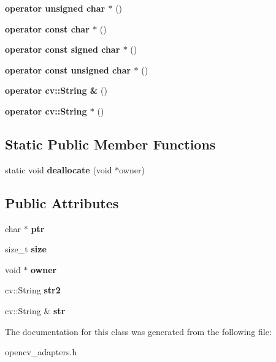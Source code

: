 \begin{DoxyCompactItemize}
{\bfseries operator unsigned char $\ast$} ()
\item 
\mbox{\label{class_str_adapter_acf859f32607b3ea2f85ea35dba26ead6}} 
{\bfseries operator const char $\ast$} ()
\item 
\mbox{\label{class_str_adapter_a37e14f172fc5ea6879ef33449b585b72}} 
{\bfseries operator const signed char $\ast$} ()
\item 
\mbox{\label{class_str_adapter_a84f92c67eaf4fde9fe765f66902c6a1a}} 
{\bfseries operator const unsigned char $\ast$} ()
\item 
\mbox{\label{class_str_adapter_a5cd88c9d42b48c949ba06aff657309e2}} 
{\bfseries operator cv\+::\+String \&} ()
\item 
\mbox{\label{class_str_adapter_a2b30d4a8f9f5951b0f91b90fd5669a1d}} 
{\bfseries operator cv\+::\+String $\ast$} ()
\end{DoxyCompactItemize}
\subsection*{Static Public Member Functions}
\begin{DoxyCompactItemize}
\item 
\mbox{\label{class_str_adapter_a9dde21755976a5ea17117a0c63911b2b}} 
static void {\bfseries deallocate} (void $\ast$owner)
\end{DoxyCompactItemize}
\subsection*{Public Attributes}
\begin{DoxyCompactItemize}
\item 
\mbox{\label{class_str_adapter_a7e9b1f20a3e60a7de03d95b7ca5ea73c}} 
char $\ast$ {\bfseries ptr}
\item 
\mbox{\label{class_str_adapter_a9d57cab3675c09415d39964ef13ee08c}} 
size\+\_\+t {\bfseries size}
\item 
\mbox{\label{class_str_adapter_af65e5866df5d4f288f50f0a1b6f67958}} 
void $\ast$ {\bfseries owner}
\item 
\mbox{\label{class_str_adapter_a22879dda622ae1c0dd00c30b0dc56503}} 
cv\+::\+String {\bfseries str2}
\item 
\mbox{\label{class_str_adapter_ada62e226c7abc1ad6f31bcbfacea653c}} 
cv\+::\+String \& {\bfseries str}
\end{DoxyCompactItemize}


The documentation for this class was generated from the following file\+:\begin{DoxyCompactItemize}
\item 
opencv\+\_\+adapters.\+h\end{DoxyCompactItemize}
